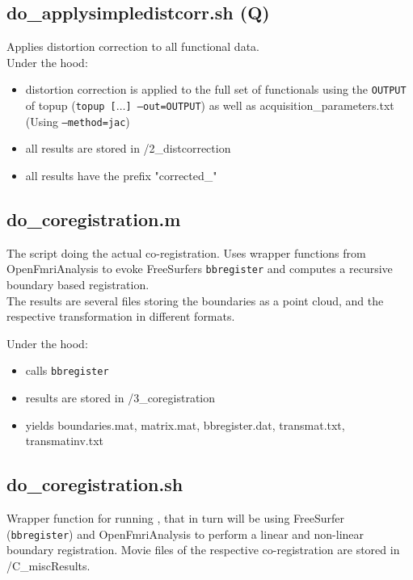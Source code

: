 \documentclass[12pt,a4paper]{scrartcl}
\begin{document}
\subsection{do\_applysimpledistcorr.sh (Q)}
\label{sh:applydistcorr}
Applies distortion correction to all functional data.\\

\noindent Under the hood:
\begin{itemize}
\item distortion correction is applied to the full set of functionals using the \texttt{OUTPUT} of topup (\texttt{topup [$\ldots$] --out=OUTPUT}) as well as acquisition\_parameters.txt (Using \texttt{--method=jac})
\item all results are stored in /2\_distcorrection
\item all results have the prefix "corrected\_"
\end{itemize}

\subsection{do\_coregistration.m}
\label{m:coreg}
The script doing the actual co-registration. Uses wrapper functions from OpenFmriAnalysis to evoke FreeSurfers \texttt{bbregister} and computes a recursive boundary based registration.\\

\noindent The results are several files storing the boundaries as a point cloud, and the respective transformation in different formats.

\noindent Under the hood:
\begin{itemize}
\item calls \texttt{bbregister}
\item results are stored in /3\_coregistration
\item yields boundaries.mat, matrix.mat, bbregister.dat, transmat.txt, transmatinv.txt
\end{itemize}

\subsection{do\_coregistration.sh}
\label{sh:coreg}
Wrapper function for running \texttt{}, that in turn will be using FreeSurfer (\texttt{bbregister}) and OpenFmriAnalysis to perform a linear and non-linear boundary registration.  Movie files of the respective co-registration are stored in /C\_miscResults.\\
\end{document}
